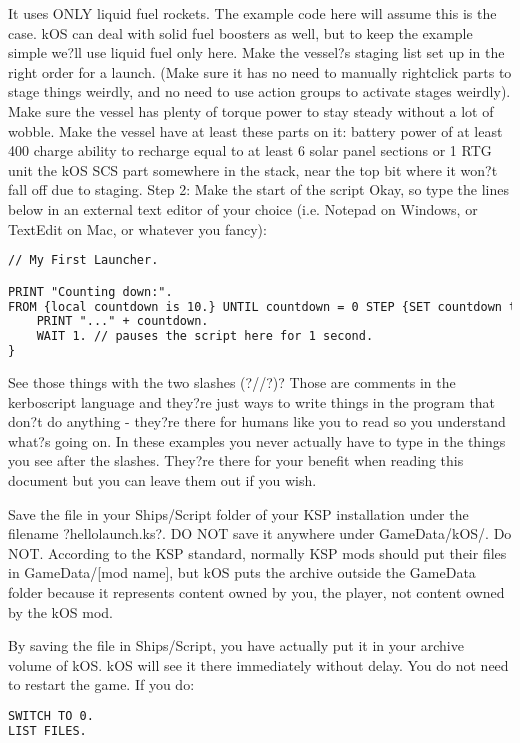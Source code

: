 It uses ONLY liquid fuel rockets. The example code here will assume this is the case. kOS can deal with solid fuel boosters as well, but to keep the example simple we?ll use liquid fuel only here.
Make the vessel?s staging list set up in the right order for a launch. (Make sure it has no need to manually rightclick parts to stage things weirdly, and no need to use action groups to activate stages weirdly).
Make sure the vessel has plenty of torque power to stay steady without a lot of wobble.
Make the vessel have at least these parts on it:
battery power of at least 400 charge
ability to recharge equal to at least 6 solar panel sections or 1 RTG unit
the kOS SCS part somewhere in the stack, near the top bit where it won?t fall off due to staging.
Step 2: Make the start of the script
Okay, so type the lines below in an external text editor of your choice (i.e. Notepad on Windows, or TextEdit on Mac, or whatever you fancy):

\begin{lstlisting}[frame=single,language=XML]
// My First Launcher.

PRINT "Counting down:".
FROM {local countdown is 10.} UNTIL countdown = 0 STEP {SET countdown to countdown - 1.} DO {
    PRINT "..." + countdown.
    WAIT 1. // pauses the script here for 1 second.
}
\end{lstlisting} 

See those things with the two slashes (?//?)? Those are comments in the kerboscript language and they?re just ways to write things in the program that don?t do anything - they?re there for humans like you to read so you understand what?s going on. In these examples you never actually have to type in the things you see after the slashes. They?re there for your benefit when reading this document but you can leave them out if you wish.

Save the file in your Ships/Script folder of your KSP installation under the filename ?hellolaunch.ks?. DO NOT save it anywhere under GameData/kOS/. Do NOT. According to the KSP standard, normally KSP mods should put their files in GameData/[mod name], but kOS puts the archive outside the GameData folder because it represents content owned by you, the player, not content owned by the kOS mod.

By saving the file in Ships/Script, you have actually put it in your archive volume of kOS. kOS will see it there immediately without delay. You do not need to restart the game. If you do:

\begin{lstlisting}[frame=single,language=XML]
SWITCH TO 0.
LIST FILES.
\end{lstlisting} 

